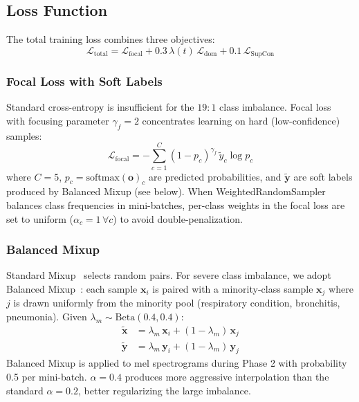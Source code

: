 \documentclass[10pt,journal,compsoc]{IEEEtran}
\begin{document}
\subsection{Loss Function}
\label{sec:loss}

The total training loss combines three objectives:
\begin{equation}
\mathcal{L}_\mathrm{total} = \mathcal{L}_\mathrm{focal}
  + 0.3\,\lambda(t)\,\mathcal{L}_\mathrm{dom}
  + 0.1\,\mathcal{L}_\mathrm{SupCon}
\label{eq:total_loss}
\end{equation}

\subsubsection{Focal Loss with Soft Labels}
Standard cross-entropy is insufficient for the $19\!:\!1$ class imbalance.
Focal loss~\cite{focal} with focusing parameter $\gamma_f = 2$ concentrates
learning on hard (low-confidence) samples:
\begin{equation}
\mathcal{L}_\mathrm{focal} = -\sum_{c=1}^{C}
  (1 - p_c)^{\gamma_f}\, \tilde{y}_c \log p_c
\label{eq:focal_loss}
\end{equation}
where $C=5$, $p_c = \mathrm{softmax}(\mathbf{o})_c$ are predicted
probabilities, and $\tilde{\mathbf{y}}$ are soft labels produced by
Balanced Mixup (see below). When WeightedRandomSampler balances class
frequencies in mini-batches, per-class weights in the focal loss are
set to uniform ($\alpha_c = 1\, \forall c$) to avoid double-penalization.

\subsubsection{Balanced Mixup}
Standard Mixup~\cite{mixup} selects random pairs. For severe class
imbalance, we adopt Balanced Mixup~\cite{balanced_mixup}: each sample
$\mathbf{x}_i$ is paired with a minority-class sample $\mathbf{x}_j$
where $j$ is drawn uniformly from the minority pool
(respiratory condition, bronchitis, pneumonia).
Given $\lambda_m \sim \mathrm{Beta}(0.4, 0.4)$:
\begin{align}
\tilde{\mathbf{x}} &= \lambda_m\,\mathbf{x}_i + (1-\lambda_m)\,\mathbf{x}_j
\label{eq:mixup_x} \\
\tilde{\mathbf{y}} &= \lambda_m\,\mathbf{y}_i + (1-\lambda_m)\,\mathbf{y}_j
\label{eq:mixup_y}
\end{align}
Balanced Mixup is applied to mel spectrograms during Phase 2 with
probability 0.5 per mini-batch. $\alpha = 0.4$ produces more aggressive
interpolation than the standard $\alpha = 0.2$, better regularizing
the large imbalance.
\end{document}

